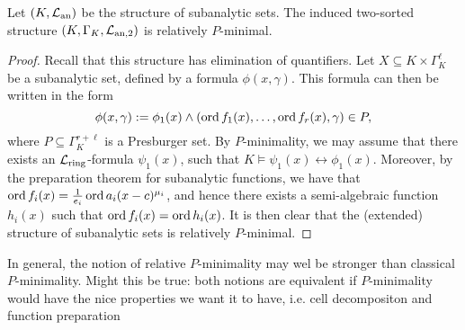 \begin{lem}
Let $(K, \mathcal{L}_{\text{an}})$ be the structure of subanalytic sets. The induced two-sorted structure $(K, \Gamma_K, \mathcal{L}_{\text{an},2})$ is relatively $P$-minimal. 
\end{lem}
\begin{proof}
Recall that this structure has elimination of quantifiers. Let $X \subseteq K \times \Gamma_K^{\ell}$ be a subanalytic set, defined by a formula $\phi(x,\gamma)$. This formula can then be written in the form
\[\phi(x,\gamma):= \phi_1(x) \wedge (\operatorname{ord} f_1(x), \ldots, \operatorname{ord} f_r(x), \gamma) \in P,\]
where $P \subseteq \Gamma_K^{r+ \ell}$ is a Presburger set. 
By $P$-minimality, we may assume that there exists an $\mathcal{L}_{\text{ring}}$-formula $\psi_1(x)$, such that $K \models \psi_1(x) \leftrightarrow \phi_1(x)$. Moreover, by the preparation theorem for subanalytic functions, we have that $\operatorname{ord} f_i(x) = \frac1{e_i}\operatorname{ord} a_i(x-c)^{\mu_i}$, and hence there exists a semi-algebraic function $h_i(x)$ such that $\operatorname{ord} f_i(x) = \operatorname{ord} h_i(x)$. It is then clear that the (extended) structure of subanalytic sets is relatively $P$-minimal.
\end{proof}
In general, the notion of relative $P$-minimality may wel be stronger than classical $P$-minimality. {\color{red} Might this be true: both notions are equivalent if $P$-minimality would have the nice properties we want it to have, i.e. cell decompositon and function preparation}